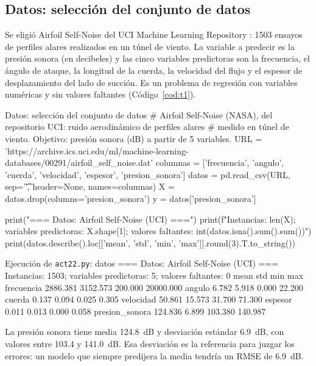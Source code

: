 \documentclass[11pt,letterpaper]{article}
\begin{document}
\subsection{Datos: selección del conjunto de datos}

Se eligió Airfoil Self-Noise del UCI Machine Learning Repository \parencite{brooks1989}: 1503 ensayos de perfiles alares realizados en un túnel de viento. La variable a predecir es la presión sonora (en decibeles) y las cinco variables predictoras son la frecuencia, el ángulo de ataque, la longitud de la cuerda, la velocidad del flujo y el espesor de desplazamiento del lado de succión. Es un problema de regresión con variables numéricas y sin valores faltantes (Código~\ref{cod:t1}).

\begin{codigo}[label=cod:t1]{Datos: selección del conjunto de datos}
# Airfoil Self-Noise (NASA), del repositorio UCI: ruido aerodinámico de perfiles alares
# medido en túnel de viento. Objetivo: presión sonora (dB) a partir de 5 variables.
URL = 'https://archive.ics.uci.edu/ml/machine-learning-databases/00291/airfoil_self_noise.dat'
columnas = ['frecuencia', 'angulo', 'cuerda', 'velocidad', 'espesor', 'presion_sonora']
datos = pd.read_csv(URL, sep='\t', header=None, names=columnas)
X = datos.drop(columns='presion_sonora')
y = datos['presion_sonora']

print("=== Datos: Airfoil Self-Noise (UCI) ===")
print(f"Instancias: {len(X)}; variables predictoras: {X.shape[1]}; valores faltantes: {int(datos.isna().sum().sum())}")
print(datos.describe().loc[['mean', 'std', 'min', 'max']].round(3).T.to_string())
\end{codigo}

\begin{consola}[label=out:t1]{Ejecución de \texttt{act22.py}: datos}
=== Datos: Airfoil Self-Noise (UCI) ===
Instancias: 1503; variables predictoras: 5; valores faltantes: 0
                    mean       std      min        max
frecuencia      2886.381  3152.573  200.000  20000.000
angulo             6.782     5.918    0.000     22.200
cuerda             0.137     0.094    0.025      0.305
velocidad         50.861    15.573   31.700     71.300
espesor            0.011     0.013    0.000      0.058
presion_sonora   124.836     6.899  103.380    140.987
\end{consola}

La presión sonora tiene media 124.8~dB y desviación estándar 6.9~dB, con valores entre 103.4 y 141.0~dB. Esa desviación es la referencia para juzgar los errores: un modelo que siempre predijera la media tendría un RMSE de 6.9~dB.
\end{document}
